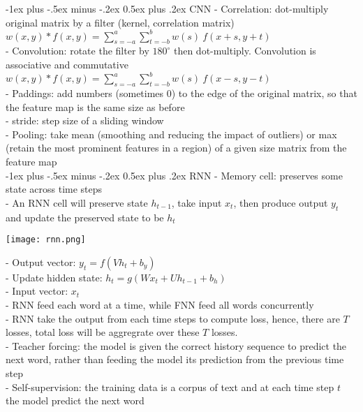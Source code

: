 \documentclass[10pt,landscape]{article}
\makeatletter
\renewcommand{\section}{\@startsection{section}{1}{0mm}%
                                {-1ex plus -.5ex minus -.2ex}%
                                {0.5ex plus .2ex}%
                                {\normalfont\large\bfseries}}
\makeatother
\begin{document}
\begin{multicols}{4}
\section{CNN}
- Correlation: dot-multiply original matrix by a filter (kernel, correlation matrix)
    $w(x,y)*f(x,y) = \sum_{s=-a}^a \sum_{t=-b}^b w(s)\ f(x+s, y + t)$\\
- Convolution: rotate the filter by $180^{\circ}$ then dot-multiply. Convolution is associative and commutative
    $w(x,y)*f(x,y) = \sum_{s=-a}^a \sum_{t=-b}^b w(s)\ f(x-s, y - t)$\\
- Paddings: add numbers (sometimes 0) to the edge of the original matrix, so that the feature map is the same size as before\\
- stride: step size of a sliding window\\
- Pooling: take mean (smoothing and reducing the impact of outliers) or max (retain the most prominent features in a region) of a given size matrix from the feature map\\

\section{RNN}
- Memory cell: preserves some state across time steps\\
- An RNN cell will preserve state $h_{t-1}$, take input $x_t$, then produce output $y_t$ and update the preserved state to be $h_t$

{\centering\texttt{[image: rnn.png]}\par}

- Output vector: $y_t = f(Vh_t + b_y)$\\
- Update hidden state: $h_t = g(Wx_t + Uh_{t-1} + b_h)$\\
- Input vector: $x_t$\\
- RNN feed each word at a time, while FNN feed all words concurrently\\
- RNN take the output from each time steps to compute loss, hence, there are $T$ losses, total loss will be aggregrate over these $T$ losses. \\
- Teacher forcing: the model is given the correct history sequence to predict the next word, rather than feeding the model its prediction from the previous time step\\
- Self-supervision: the training data is a corpus of text and at each time step $t$ the model predict the next word\\


\end{multicols}
\end{document}
